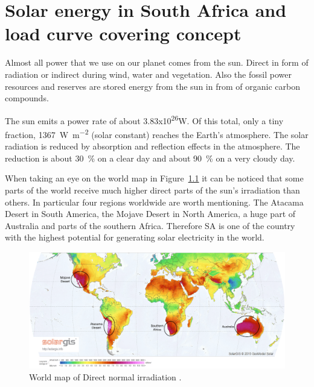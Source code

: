 \chapter{Solar energy in South Africa and load curve covering concept}\label{Solar power in South Africa}
Almost all power that we use on our planet comes from the sun. Direct in form of radiation or indirect during wind, water and vegetation. Also the fossil power resources and reserves are stored energy from the sun in from of organic carbon compounds. 

The sun emits a power rate of about 3.83x10\textsuperscript{26}W. Of this total, only a tiny fraction, \SI{1367}{\watt\per\square\metre} (solar constant) reaches the Earth’s atmosphere. The solar radiation is reduced by absorption and reflection effects in the atmosphere.  The reduction is about \SI{30}{\percent} on a clear day and about \SI{90}{\percent} on a very cloudy day. \cite{Stine2001a}

When taking an eye on the world map in Figure~\ref{WorldDNI} it can be noticed that some parts of the world receive much higher direct parts of the sun’s irradiation than others. In particular four regions worldwide are worth mentioning. The Atacama Desert in South America, the Mojave Desert in North America, a huge part of Australia and parts of the southern Africa. Therefore SA is one of the country with the highest potential for generating solar electricity in the world.

\begin{figure}[h!] 
\centering
\includegraphics[width=1\linewidth]{FIG/WorldDNI}
\caption[World map of Direct normal irradiation.]{World map of Direct normal irradiation \cite{SolarGIS2015c}.}\label{WorldDNI}
\end{figure}  
